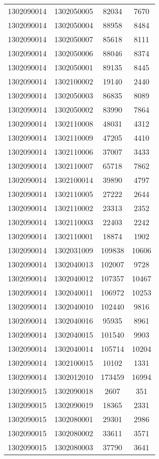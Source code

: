 \begin{longtable}{llcc}
1302090014 & 1302050005 & 82034 & 7670\\
1302090014 & 1302050004 & 88958 & 8484\\
1302090014 & 1302050007 & 85618 & 8111\\
1302090014 & 1302050006 & 88046 & 8374\\
1302090014 & 1302050001 & 89135 & 8445\\
1302090014 & 1302100002 & 19140 & 2440\\
1302090014 & 1302050003 & 86835 & 8089\\
1302090014 & 1302050002 & 83990 & 7864\\
1302090014 & 1302110008 & 48031 & 4312\\
1302090014 & 1302110009 & 47205 & 4410\\
1302090014 & 1302110006 & 37007 & 3433\\
1302090014 & 1302110007 & 65718 & 7862\\
1302090014 & 1302100014 & 39890 & 4797\\
1302090014 & 1302110005 & 27222 & 2644\\
1302090014 & 1302110002 & 23313 & 2352\\
1302090014 & 1302110003 & 22403 & 2242\\
1302090014 & 1302110001 & 18874 & 1902\\
1302090014 & 1302031009 & 109838 & 10606\\
1302090014 & 1302040013 & 102007 & 9728\\
1302090014 & 1302040012 & 107357 & 10467\\
1302090014 & 1302040011 & 106972 & 10253\\
1302090014 & 1302040010 & 102440 & 9816\\
1302090014 & 1302040016 & 95935 & 8961\\
1302090014 & 1302040015 & 101540 & 9903\\
1302090014 & 1302040014 & 105714 & 10204\\
1302090014 & 1302100015 & 10102 & 1331\\
1302090014 & 1302012010 & 173459 & 16994\\
1302090015 & 1302090018 & 2607 & 351\\
1302090015 & 1302090019 & 18365 & 2331\\
1302090015 & 1302080001 & 29301 & 2986\\
1302090015 & 1302080002 & 33611 & 3571\\
1302090015 & 1302080003 & 37790 & 3641\\

\end{longtable}
